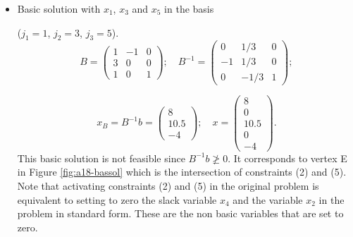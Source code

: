 \begin{enumerate}
\begin{itemize}
    $$
    x_B = B^{-1}b=
    \begin{pmatrix}
      2  \\
      4.5 \\
      6.5
    \end{pmatrix};
    \quad
    x=
    \begin{pmatrix}
      2  \\
      4.5 \\
      0  \\
      0\\
      6.5
    \end{pmatrix}.
    $$
    This basic solution is feasible as $ B^{-1}b  \geq 0$. It corresponds to vertex H in Figure  \ref{fig:a18-bassol}
    which is the intersection of constraints (1) and (2). Note that
    activating constraints (1) and (2) in the original problem is
    equivalent to setting to zero the slack variables $x_3$ and $x_4$ in the
    problem in standard form. These are the non basic variables that
    are set to zero.

  \item  Basic solution with $x_1$, $x_3$ and $x_5$ in the basis

    ($j_1=1$, $j_2=3$, $j_3=5$).
    $$B=
    \begin{pmatrix}
      1 & -1 & 0 \\
      3 & 0 & 0 \\
      1 & 0 & 1
    \end{pmatrix};
    \quad
    B^{-1}=
    \begin{pmatrix}
      0 & 1/3 & 0 \\
      -1 & 1/3 & 0 \\
      0 & -1/3 & 1
    \end{pmatrix};
    $$

    $$
    x_B = B^{-1}b=
    \begin{pmatrix}
      8  \\
      10.5 \\
      -4
    \end{pmatrix};
    \quad
    x=
    \begin{pmatrix}
      8  \\
      0 \\
      10.5\\
      0\\
      -4
    \end{pmatrix}.
    $$
    This basic solution is not feasible since $ B^{-1}b  \ngeq 0$. It corresponds to vertex E in Figure  \ref{fig:a18-bassol}
    which is the intersection of constraints (2) and (5). Note that
    activating constraints (2) and (5) in the original problem is
    equivalent to setting to zero the slack variable $x_4$ and the variable $x_2$ in the
    problem in standard form. These are the non basic variables that
    are set to zero.
  \end{itemize}



\end{enumerate}
